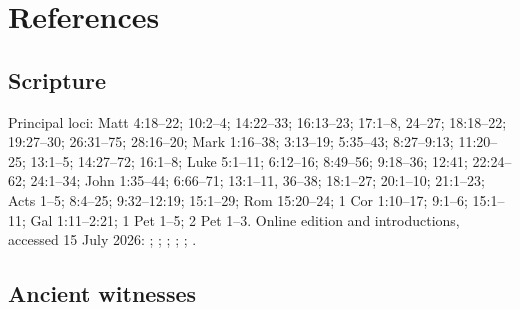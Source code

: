 \section{References}\label{sec:peter-references}

\subsection{Scripture}

Principal loci: Matt 4:18--22; 10:2--4; 14:22--33; 16:13--23; 17:1--8,
24--27; 18:18--22; 19:27--30; 26:31--75; 28:16--20; Mark 1:16--38;
3:13--19; 5:35--43; 8:27--9:13; 11:20--25; 13:1--5; 14:27--72; 16:1--8;
Luke 5:1--11; 6:12--16; 8:49--56; 9:18--36; 12:41; 22:24--62; 24:1--34;
John 1:35--44; 6:66--71; 13:1--11, 36--38; 18:1--27; 20:1--10;
21:1--23; Acts 1--5; 8:4--25; 9:32--12:19; 15:1--29; Rom 15:20--24;
1 Cor 1:10--17; 9:1--6; 15:1--11; Gal 1:11--2:21; 1 Pet 1--5; 2 Pet 1--3.
Online edition and introductions, accessed 15 July 2026:
;
;
;
;
;
.

\subsection{Ancient witnesses}


